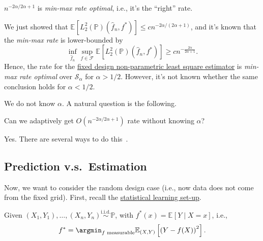 \begin{remark}\label{rmk:min-max-rate-optimal}
	\(n^{-2\alpha / 2\alpha +1}\) is \emph{min-max rate optimal}, i.e., it's the ``right'' rate.
\end{remark}
\begin{explanation}
	We just showed that \(\mathbb{E}_{}[ L_2^2 (\mathbb{P} ) ( \hat{f} _n, f^{\ast} )] \leq c n^{-2\alpha / (2\alpha + 1)}\), and it's known that the \emph{min-max rate} is lower-bounded by
	\[
		\inf _{\hat{f} _n} \sup _{f \in \mathscr{F} } \mathbb{E}_{}\left[ L_2^2(\mathbb{P} ) (\hat{f} _n, f^{\ast} )\right] \geq c n^{-\frac{2\alpha}{2\alpha + 1}}.
	\]
	Hence, the rate for the \hyperref[prb:fixed-design-non-parametric-LS]{fixed design non-parametric least square estimator} is \emph{min-max rate optimal} over \(\mathcal{S} _\alpha \) for \(\alpha > 1 / 2\). However, it's not known whether the same conclusion holds for \(\alpha < 1 / 2\).
\end{explanation}

We do not know \(\alpha \). A natural question is the following.

\begin{problem*}
	Can we adaptively get \(O(n^{-2\alpha / 2\alpha + 1})\) rate without knowing \(\alpha \)?
\end{problem*}
\begin{answer}
	Yes. There are several ways to do this~\cite{tsybakov2008introduction}.
\end{answer}

\subsection{Prediction v.s.\ Estimation}
Now, we want to consider the random design case (i.e., now data does not come from the fixed grid). First, recall the \hyperref[prb:ERM]{statistical learning set-up}.

\begin{prev}
	Given \((X_1, Y_1), \dots , (X_n, Y_n) \overset{\text{i.i.d.} }{\sim } \mathbb{P} \), with \(f^{\ast} (x) = \mathbb{E}_{}\left[Y \mid X = x \right] \), i.e.,
	\[
		f^{\ast} = \argmin_{f \text{ measurable} } \mathbb{E}_{(X, Y)}\left[ \left( Y - f(X)  \right) ^2 \right] .
	\]
\end{prev}

